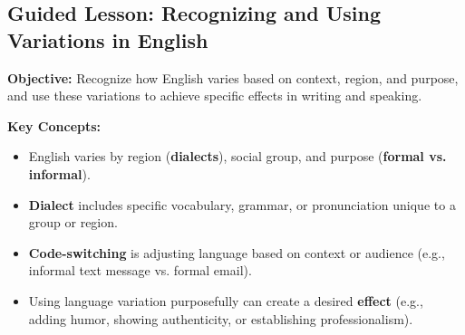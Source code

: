 \documentclass[12pt]{article}
\title{}
\date{}
\begin{document}
\subsection*{Guided Lesson: Recognizing and Using Variations in English}
\onehalfspacing

\begin{tcolorbox}[colframe=black!40, colback=gray!5, 
coltitle=black, colbacktitle=black!20, fonttitle=\bfseries\Large, 
title=Learning Objective, halign title=center, left=5pt, right=5pt, top=5pt, bottom=15pt]
\textbf{Objective:} Recognize how English varies based on context, region, and purpose, and use these variations to achieve specific effects in writing and speaking.
\end{tcolorbox}

\vspace{1em}

\begin{tcolorbox}[colframe=black!60, colback=white, 
coltitle=black, colbacktitle=black!15, fonttitle=\bfseries\Large, 
title=Key Concepts and Vocabulary, halign title=center, left=10pt, right=10pt, top=10pt, bottom=15pt]
\textbf{Key Concepts:}
\begin{itemize}
    \item English varies by region (\textbf{dialects}), social group, and purpose (\textbf{formal vs. informal}).
    \item \textbf{Dialect} includes specific vocabulary, grammar, or pronunciation unique to a group or region.
    \item \textbf{Code-switching} is adjusting language based on context or audience (e.g., informal text message vs. formal email).
    \item Using language variation purposefully can create a desired \textbf{effect} (e.g., adding humor, showing authenticity, or establishing professionalism).
\end{itemize}
\end{tcolorbox}

\vspace{1em}
\end{document}
